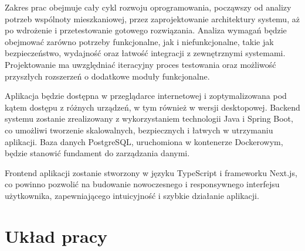 Zakres prac obejmuje cały cykl rozwoju oprogramowania, począwszy od analizy potrzeb wspólnoty mieszkaniowej, przez zaprojektowanie architektury systemu, aż po wdrożenie i przetestowanie gotowego rozwiązania. Analiza wymagań będzie obejmować zarówno potrzeby funkcjonalne, jak i niefunkcjonalne, takie jak bezpieczeństwo, wydajność oraz łatwość integracji z zewnętrznymi systemami. Projektowanie ma uwzględniać iteracyjny proces testowania oraz możliwość przyszłych rozszerzeń o dodatkowe moduły funkcjonalne.

Aplikacja będzie dostępna w przeglądarce internetowej i zoptymalizowana pod kątem dostępu z różnych urządzeń, w tym również w wersji desktopowej. Backend systemu zostanie zrealizowany z wykorzystaniem technologii Java i Spring Boot, co umożliwi tworzenie skalowalnych, bezpiecznych i łatwych w utrzymaniu aplikacji. Baza danych PostgreSQL, uruchomiona w kontenerze Dockerowym, będzie stanowić fundament do zarządzania danymi.

Frontend aplikacji zostanie stworzony w języku TypeScript i frameworku Next.js, co powinno pozwolić na budowanie nowoczesnego i responsywnego interfejsu użytkownika, zapewniającego intuicyjność i szybkie działanie aplikacji.

\section{Układ pracy}
